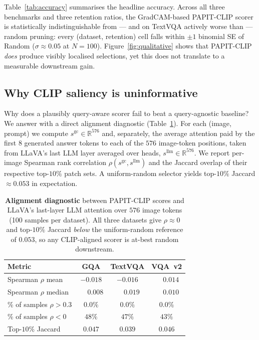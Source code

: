 \documentclass[10pt,twocolumn,letterpaper]{article}
\begin{document}
Table~\ref{tab:accuracy} summarises the headline accuracy. Across all
three benchmarks and three retention ratios, the GradCAM-based
PAPIT-CLIP scorer is statistically indistinguishable from --- and
on TextVQA actively worse than --- random pruning: every (dataset,
retention) cell falls within $\pm 1$ binomial SE of Random
($\sigma\!\approx\!0.05$ at $N{=}100$). Figure~\ref{fig:qualitative}
shows that PAPIT-CLIP \emph{does} produce visibly localised
selections, yet this does not translate to a measurable downstream
gain.

\subsection{Why CLIP saliency is uninformative}
\label{sec:diagnostic}

Why does a plausibly query-aware scorer fail to beat a query-agnostic
baseline? We answer with a direct alignment diagnostic
(Table~\ref{tab:diagnostic}).
For each (image, prompt) we compute $s^{\text{gc}}\in\mathbb{R}^{576}$
and, separately, the average attention paid by the first $8$ generated
answer tokens to each of the $576$ image-token positions, taken from
LLaVA's last LLM layer averaged over heads, $s^{\text{llm}}\in\mathbb{R}^{576}$.
We report per-image Spearman rank correlation $\rho(s^{\text{gc}},s^{\text{llm}})$
and the Jaccard overlap of their respective top-$10\%$ patch sets.
A uniform-random selector yields top-$10\%$ Jaccard ${\approx}0.053$
in expectation.

\begin{table}[t]
\centering
\small
\caption{\textbf{Alignment diagnostic} between PAPIT-CLIP scores and
LLaVA's last-layer LLM attention over $576$ image tokens
(100 samples per dataset). All three datasets give $\rho{\approx}0$
and top-$10\%$ Jaccard \emph{below} the uniform-random reference of
$0.053$, so any CLIP-aligned scorer is at-best random downstream.}
\label{tab:diagnostic}
\begin{tabular}{@{}lccc@{}}
\toprule
Metric & GQA & TextVQA & VQA~v2 \\
\midrule
Spearman $\rho$ mean   & $-0.018$ & $-0.016$ & $\phantom{-}0.014$ \\
Spearman $\rho$ median & $\phantom{-}0.008$ & $\phantom{-}0.019$ & $\phantom{-}0.010$ \\
\% of samples $\rho\!>\!0.3$    & $0.0\%$ & $0.0\%$ & $0.0\%$ \\
\% of samples $\rho\!<\!0$      & $48\%$ & $47\%$ & $43\%$ \\
Top-$10\%$ Jaccard               & $0.047$ & $0.039$ & $0.046$ \\
\bottomrule
\end{tabular}
\end{table}
\end{document}
